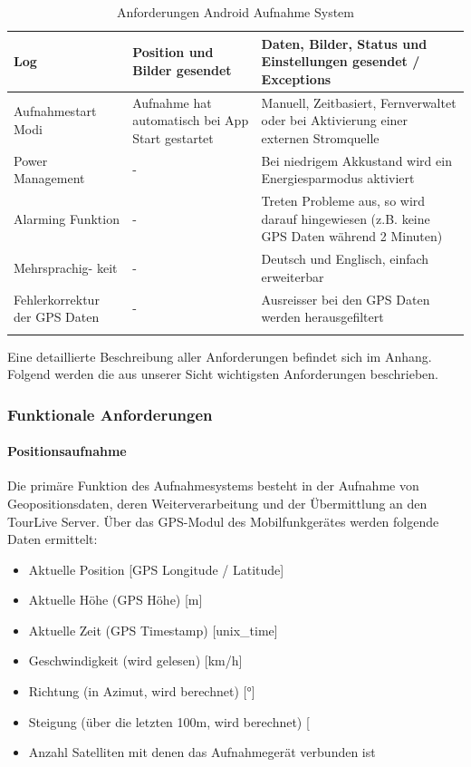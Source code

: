 {\begin{longtable}{  p{3.5cm} | p{4.3cm} | p{4.3cm} }
    \hline 
    Log & Position und Bilder gesendet & Daten, Bilder, Status und Einstellungen gesendet / Exceptions\\
    \hline 
    Aufnahmestart Modi & Aufnahme hat automatisch bei App Start gestartet & Manuell, Zeitbasiert, Fernverwaltet oder bei Aktivierung einer externen Stromquelle\\
    \hline 
   	Power Management & - & Bei niedrigem Akkustand wird ein Energiesparmodus aktiviert\\
    \hline 
    Alarming Funktion & - & Treten Probleme aus, so wird darauf hingewiesen (z.B. keine GPS Daten w\"{a}hrend 2 Minuten)\\
    \hline 
    Mehrsprachig- keit & - & Deutsch und Englisch, einfach erweiterbar\\
    \hline 
    Fehlerkorrektur der GPS Daten & - & Ausreisser bei den GPS Daten werden herausgefiltert\\
    
    
\caption{Anforderungen Android Aufnahme System}
\end{longtable}}

Eine detaillierte Beschreibung aller Anforderungen befindet sich im Anhang. Folgend werden die aus unserer Sicht wichtigsten Anforderungen beschrieben.

\subsubsection{Funktionale Anforderungen}
\paragraph{Positionsaufnahme}
Die primäre Funktion des Aufnahmesystems besteht in der Aufnahme von Geopositionsdaten, deren Weiterverarbeitung und der Übermittlung an den TourLive Server. Über das GPS-Modul des Mobilfunkgerätes werden folgende Daten ermittelt:
\begin{itemize}
\item Aktuelle Position [GPS Longitude / Latitude]
\item Aktuelle H\"{o}he (GPS H\"{o}he) [m]
\item Aktuelle Zeit (GPS Timestamp) [unix\_time]
\item Geschwindigkeit (wird gelesen) [km/h]
\item Richtung (in Azimut, wird berechnet) [°]
\item Steigung (\"{u}ber die letzten 100m, wird berechnet) [%
\item Anzahl Satelliten mit denen das Aufnahmeger\"{a}t verbunden ist
\end{itemize}

